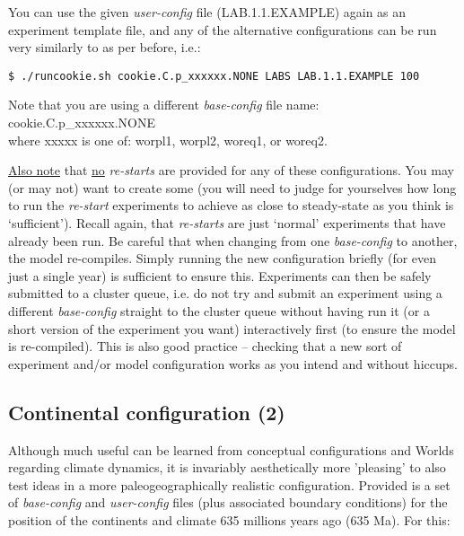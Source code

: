 You can use the given \textit{user-config} file (\textsf{\footnotesize LAB.1.1.EXAMPLE}) again as an experiment template file, and any of the alternative configurations can be run very similarly to as per before, i.e.:

\vspace{-2mm}
\begin{verbatim}
$ ./runcookie.sh cookie.C.p_xxxxxx.NONE LABS LAB.1.1.EXAMPLE 100
\end{verbatim}
\vspace{-2mm}

Note that you are using a different \textit{base-config} file name: \textsf{\footnotesize cookie.C.p\_xxxxxx.NONE}
\\where \textsf{\footnotesize xxxxx} is one of: \textsf{\footnotesize worpl1}, \textsf{\footnotesize worpl2}, \textsf{\footnotesize woreq1}, or \textsf{\footnotesize woreq2}.

\uline{Also note} that \uline{no} \textit{re-starts} are provided for any of these configurations. You may (or may not) want to create some (you will need to judge for yourselves how long to run the \textit{re-start} experiments to achieve as close to steady-state as you think is ‘sufficient’). Recall again, that \textit{re-starts} are just ‘normal’ experiments that have already been run.
Be careful that when changing from one \textit{base-config} to another, the model re-compiles. Simply running the new configuration briefly (for even just a single year) is sufficient to ensure this. Experiments can then be safely submitted to a cluster queue, i.e. do not try and submit an experiment using a different \textit{base-config} straight to the cluster queue without having run it (or a short version of the experiment you want) interactively first (to ensure the model is re-compiled). This is also good practice – checking that a new sort of experiment and/or model configuration works as you intend and without hiccups.


\subsection{Continental configuration (2)}

Although much useful can be learned from conceptual configurations and Worlds regarding climate dynamics, it is invariably aesthetically more 'pleasing' to also test ideas in a more paleogeographically realistic configuration. Provided is a set of \textit{base-config} and \textit{user-config} files (plus associated boundary conditions) for the position of the continents and climate 635 millions years ago (635 Ma). For this:

